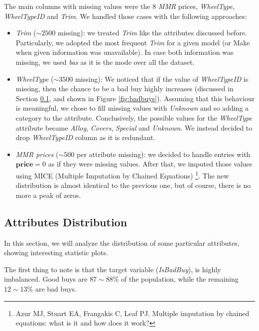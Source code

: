 \documentclass{article}
\begin{document}
	The main columns with missing values were the 8 \emph{MMR} prices, \emph{WheelType, WheelTypeID} and \emph{Trim}.
	We handled those cases with the following approaches:
	\begin{itemize}
		\item \emph{Trim} ($\sim 2500$ missing): we treated \emph{Trim} like the attributes discussed before. Particularly, we adopted the most frequent \emph{Trim} for a given model (or Make when given information was unavailable). In case both information was missing, we used \emph{bas} as it is the mode over all the dataset.
		\item \emph{WheelType} ($\sim 3500$ missing): We noticed that if the value of \emph{WheelTypeID} is missing, then the chance to be a bad buy highly increases (discussed in Section \ref{sec:attrDistr}, and shown in Figure \ref{fig:badbuys}). Assuming that this behaviour is meaningful, we chose to fill missing values with \emph{Unknown} and so adding a category to the attribute. Conclusively, the possible values for the \emph{WheelType} attribute became \emph{Alloy}, \emph{Covers}, \emph{Special} and \emph{Unknown}. We instead decided to drop \emph{WheelTypeID} column as it is redundant.
		\item \emph{MMR prices} ($\sim 500$ per attribute missing): we decided to handle entries with $\mathbf{price} = 0$ as if they were missing values. After that, we imputed those values using MICE (Multiple Imputation by Chained Equations) \footnote{Azur MJ, Stuart EA, Frangakis C, Leaf PJ. Multiple imputation by chained equations: what is it and how does it work?}. The new distribution is almost identical to the previous one, but of course, there is no more a peak of zeros. 
	\end{itemize}
	
	
	
	\subsection{Attributes Distribution}
	\label{sec:attrDistr}
	In this section, we will analyze the distribution of some particular attributes, showing interesting statistic plots.
	
	The first thing to note is that the target variable (\emph{IsBadBuy}), is highly imbalanced. Good buys are $87\sim88 \%$ of the population, while the remaining $12\sim13 \%$ are bad buys.
	
\end{document}
